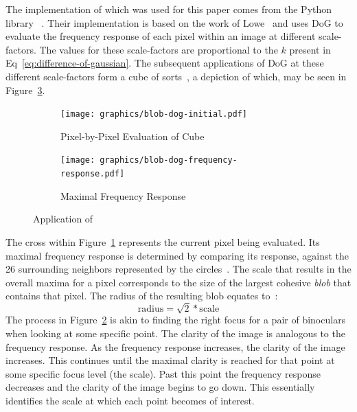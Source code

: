 The implementation of \blobdog{} which was used for this paper comes from the Python library ~\cite{scikit-learn}.
Their implementation is based on the work of Lowe~\cite{Lowe2004} and uses DoG to evaluate the frequency response of each pixel within an image at different scale-factors. The values for these scale-factors are proportional to the $k$ present in Eq~\eqref{eq:difference-of-gaussian}. The subsequent applications of DoG at these different scale-factors form a cube of sorts~\cite{Lowe2004}, a depiction of which, may be seen in Figure~\ref{fig:blob-dog-application}.
\begin{figure}[H]
    \centering
    \begin{subfigure}[b]{0.45\textwidth}
        \texttt{[image: graphics/blob-dog-initial.pdf]}
        \caption{\label{fig:blob-dog-initial} Pixel-by-Pixel Evaluation of \blobdog{} Cube}
    \end{subfigure}
    \begin{subfigure}[b]{0.45\textwidth}
        \texttt{[image: graphics/blob-dog-frequency-response.pdf]}
        \caption{\label{fig:blob-dog-maximal} Maximal Frequency Response}
    \end{subfigure}
    \caption{\label{fig:blob-dog-application} Application of \blobdog{}}
\end{figure}
\vspace{-1.5em}
The cross within Figure~\ref{fig:blob-dog-initial} represents the current pixel being evaluated. Its maximal frequency response is determined by comparing its response, against the 26 surrounding neighbors represented by the circles~\cite{Lowe2004}. The scale that results in the overall maxima for a pixel corresponds to the size of the largest cohesive \textit{blob} that contains that pixel. The radius of the resulting blob equates to~\cite{scikit-learn}:
\begin{equation}
    \label{eq:blob-scale}
    \text{radius} = \sqrt{2}*\text{scale}
\end{equation}
\indent{}The process in Figure~\ref{fig:blob-dog-maximal} is akin to finding the right focus for a pair of binoculars when looking at some specific point. The clarity of the image is analogous to the frequency response. As the frequency response increases, the clarity of the image increases. This continues until the maximal clarity is reached for that point at some specific focus level (the scale). Past this point the frequency response decreases and the clarity of the image begins to go down. This essentially identifies the scale at which each point becomes of interest.


